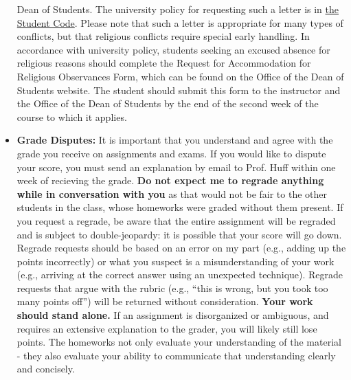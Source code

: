 \documentclass[11pt, a4paper]{article}
\begin{document}
\begin{itemize}
                Dean of Students.  The university policy for requesting such a
                letter is in
                \href{http://studentcode.illinois.edu/article1_part5_1-501.html}{the
                Student Code}. Please note that such a letter is appropriate
                for many types of conflicts, but that religious conflicts
                require special early handling. In accordance with university
                policy, students seeking an excused absence for religious
                reasons should complete the Request for Accommodation for
                Religious Observances Form, which can be found on the Office of
                the Dean of Students website. The student should submit this
                form to the instructor and the Office of the Dean of Students
                by the end of the second week of the course to which it
                applies.

\item[] \textbf{Grade Disputes:} It is important that you understand and agree
        with the grade you receive on assignments and exams. If you would like
        to dispute your score, you must send an explanation by email to Prof.
        Huff within one week of recieving the grade.
        \textbf{Do not expect me to regrade anything while in conversation with
        you} as that would not be fair to the other students in the class, whose
        homeworks were graded without them present.  If you request a regrade,
        be aware that the entire assignment will be regraded and is subject to
        double-jeopardy: it is possible that your score will go down.
        Regrade requests should be based on an error on my part (e.g., adding
        up the points incorrectly) or what you suspect is a misunderstanding of
        your work (e.g., arriving at the correct answer using an unexpected
        technique). Regrade requests that argue with the rubric (e.g., ``this is
        wrong, but you took too many points off'') will be returned without
        consideration.
        \textbf{Your work should stand alone.} If an assignment is disorganized or
        ambiguous, and requires an extensive explanation to the grader, you
        will likely still lose points. The homeworks not only evaluate your
        understanding of the material - they also evaluate your ability to
        communicate that understanding clearly and concisely.

\end{itemize}
\end{document}
